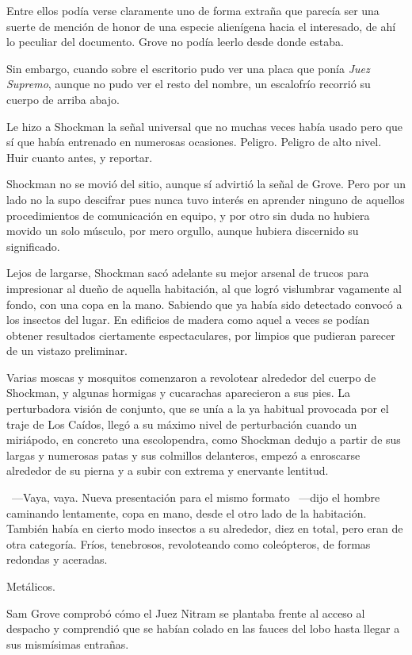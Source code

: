 Entre ellos podía verse claramente uno de forma extraña que parecía ser una suerte de mención de honor de una especie alienígena hacia el interesado, de ahí lo peculiar del documento. Grove no podía leerlo desde donde estaba.

Sin embargo, cuando sobre el escritorio pudo ver una placa que ponía \emph{Juez Supremo}, aunque no pudo ver el resto del nombre, un escalofrío recorrió su cuerpo de arriba abajo.

Le hizo a Shockman la señal universal que no muchas veces había usado pero que sí que había entrenado en numerosas ocasiones. Peligro. Peligro de alto nivel. Huir cuanto antes, y reportar.

Shockman no se movió del sitio, aunque sí advirtió la señal de Grove. Pero por un lado no la supo descifrar pues nunca tuvo interés en aprender ninguno de aquellos procedimientos de comunicación en equipo, y por otro sin duda no hubiera movido un solo músculo, por mero orgullo, aunque hubiera discernido su significado.

Lejos de largarse, Shockman sacó adelante su mejor arsenal de trucos para impresionar al dueño de aquella habitación, al que logró vislumbrar vagamente al fondo, con una copa en la mano. Sabiendo que ya había sido detectado convocó a los insectos del lugar. En edificios de madera como aquel a veces se podían obtener resultados ciertamente espectaculares, por limpios que pudieran parecer de un vistazo preliminar.

Varias moscas y mosquitos comenzaron a revolotear alrededor del cuerpo de Shockman, y algunas hormigas y cucarachas aparecieron a sus pies. La perturbadora visión de conjunto, que se unía a la ya habitual provocada por el traje de Los Caídos, llegó a su máximo nivel de perturbación cuando un miriápodo, en concreto una escolopendra, como Shockman dedujo a partir de sus largas y numerosas patas y sus colmillos delanteros, empezó a enroscarse alrededor de su pierna y a subir con extrema y enervante lentitud.

~---Vaya, vaya. Nueva presentación para el mismo formato ~---dijo el hombre caminando lentamente, copa en mano, desde el otro lado de la habitación. También había en cierto modo insectos a su alrededor, diez en total, pero eran de otra categoría. Fríos, tenebrosos, revoloteando como coleópteros, de formas redondas y aceradas.

Metálicos.

Sam Grove comprobó cómo el Juez Nitram se plantaba frente al acceso al despacho y comprendió que se habían colado en las fauces del lobo hasta llegar a sus mismísimas entrañas.

\endinput
